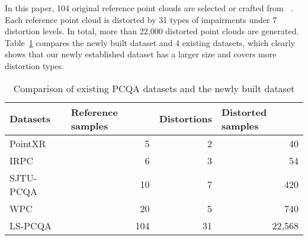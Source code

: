 \documentclass[acmsmall]{acmart}
\begin{document}
\par In this paper, 104 original reference point clouds are selected or crafted from ~\cite{Mpeg1,Mpeg2,JPEG,Mpeg3,Nouri2017Greyc,free3d,sketchfab}. Each reference point cloud is distorted by 31 types of impairments under 7 distortion levels. In total, more than 22,000 distorted point clouds are generated. Table~\ref{comparisonScale} compares the newly built dataset and 4 existing datasets, which clearly shows that our newly established dataset has a larger size and covers more distortion types.

\begin{table}[htbp]
  \centering
  \caption{Comparison of existing PCQA datasets and the newly built dataset}
  \begin{footnotesize}
    \begin{tabular}{l|rrr}
    \hline
    Datasets & \multicolumn{1}{l}{Reference samples} & \multicolumn{1}{l}{Distortions} & \multicolumn{1}{l}{Distorted samples} \\
    \hline
    PointXR & 5     & 2     & 40 \\
    IRPC  & 6     & 3     & 54 \\
    SJTU-PCQA & 10    & 7     & 420 \\
    WPC & 20   & 5     & 740 \\
    \hline
    LS-PCQA & 104   & 31    & 22,568 \\
    \hline
    \end{tabular}\end{footnotesize}
  \label{comparisonScale}\end{table}
\end{document}
